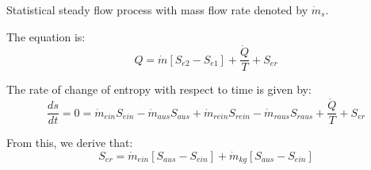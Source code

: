 Statistical steady flow process with mass flow rate denoted by \(\dot{m}_s\).

The equation is:
\[ Q = \dot{m} [S_{e2} - S_{e1}] + \frac{\dot{Q}}{T} + S_{er} \]

The rate of change of entropy with respect to time is given by:
\[ \frac{ds}{dt} = 0 = \dot{m}_{ein} S_{ein} - \dot{m}_{aus} S_{aus} + \dot{m}_{rein} S_{rein} - \dot{m}_{raus} S_{raus} + \frac{\dot{Q}}{T} + S_{er} \]

From this, we derive that:
\[ S_{er} = \dot{m}_{ein} [S_{aus} - S_{ein}] + \dot{m}_{kg} [S_{aus} - S_{ein}] \]